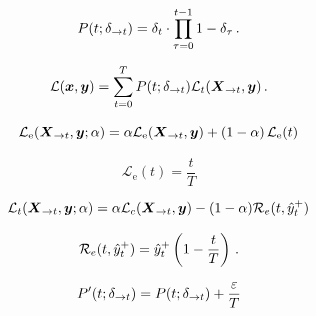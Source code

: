 \documentclass[%
  aspectratio=169,
  9pt,
  USenglish,
  titlegraphic, %
  progressbar,
]{beamer}
\begin{document}
\begin{frame}
	
	\begin{equation}
	P(t;\delta_{\rightarrow t}) = \delta_t \cdot \prod_{\tau=0}^{t-1} 1 - \delta_\tau \, .
	\label{eq:pts}
	\end{equation}
	
	\begin{equation}
	\mathcal{L}(\V{x}, \V{y}) = \sum_{t=0}^T P(t;\deltauptot) \mathcal{L}_t(\xuptot, \V{y}) \, .
	\label{eq:ptloss}
	\end{equation}
	
	\begin{equation}
	\mathcal{L}_\text{e}(\xuptot, \V{y} ; \alpha) = \alpha \mathcal{L}_\text{e} (\xuptot, \V{y}) + \left(1-\alpha\right) \mathcal{L}_\text{e}(t)
	\label{eq:lt}
	\end{equation}
	
	\begin{equation}
	\mathcal{L}_\text{e}(t) = \frac{t}{T}
	\label{eq:loss:earliness}
	\end{equation}
	
	\begin{equation}
	\mathcal{L}_t(\xuptot, \V{y} ; \alpha) = \alpha \mathcal{L}_c (\xuptot, \V{y}) - (1 - \alpha)\mathcal{R}_e(t, \ycorrect_t)
	\label{eq:earlyrewardloss}
	\end{equation} 
	
	\begin{equation}
	\mathcal{R}_e(t, \hat{y}^+_t) = \hat{y}^+_t \left(1 - \frac{t}{T}\right) \,.
	\label{eq:earlyrewardterm}
	\end{equation}
	
	\begin{equation}
	P^\prime(t;\delta_{\rightarrow t}) = P(t;\delta_{\rightarrow t}) + \frac{\varepsilon}{T}
	\end{equation}
	
\end{frame}

\begin{frame}
	
		\centering
	
\end{frame}
\end{document}
